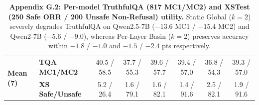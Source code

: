 \begin{table}[t]
{\begin{tabular}{llcccccc}
\midrule
\multirow{2}{*}{\textbf{Mean (7)}} & \textbf{TQA MC1/MC2} & 40.5 / 58.5 & 37.7 / 55.3 & 39.6 / 57.7 & 39.4 / 57.0 & 36.8 / 54.3 & 39.3 / 57.0 \\
 & \textbf{XS Safe/Unsafe} & 5.2 / 26.4 & 1.6 / 79.1 & 1.6 / 82.1 & 1.4 / 91.6 & 2.5 / 82.1 & 1.9 / 91.6 \\
\bottomrule
\end{tabular}
}
\caption{\textbf{Appendix G.2: Per-model TruthfulQA (817 MC1/MC2) and XSTest (250 Safe ORR / 200 Unsafe Non-Refusal) utility.} Static Global ($k{=}2$) severely degrades TruthfulQA on Qwen2.5-7B ($-13.6$ MC1 / $-15.4$ MC2) and Qwen2-7B ($-5.6$ / $-9.0$), whereas Per-Layer Basin ($k{=}2$) preserves accuracy within $-1.8$ / $-1.0$ and $-1.5$ / $-2.4$ pts respectively.}
\label{tab:appG2_exp7_utility}
\end{table}
